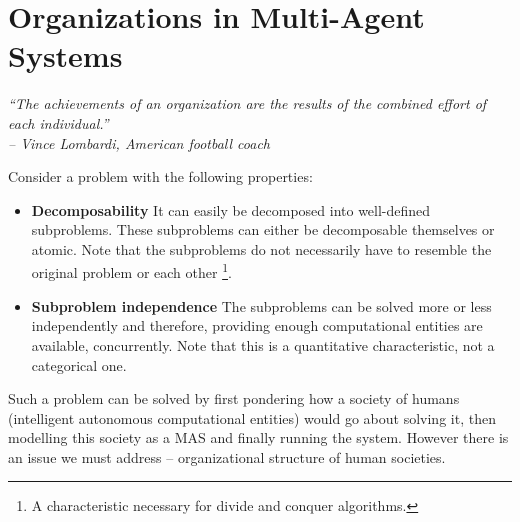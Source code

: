 
\chapter{Organizations in Multi-Agent Systems}

\begin{flushright}
\textit{``The achievements of an organization are the results of the combined effort of each individual.''}\\
\textit{-- Vince Lombardi, American football coach}
\end{flushright}

Consider a problem with the following properties:
\begin{itemize}
	\item \textbf{Decomposability} It can easily be decomposed into well-defined subproblems. These subproblems can either be decomposable themselves or atomic.
	Note that the subproblems do not necessarily have to resemble the original problem or each other
	\footnote{A characteristic necessary for divide and conquer algorithms.}. 
	\item \textbf{Subproblem independence} The subproblems can be solved more or less independently and therefore, providing enough computational entities are available, concurrently.
	Note that this is a quantitative characteristic, not a categorical one.
\end{itemize}

Such a problem can be solved by first pondering how a society of humans (intelligent autonomous computational entities) would go about solving it, then modelling this society as a MAS and finally running the system.
However there is an issue we must address -- organizational structure of human societies.

